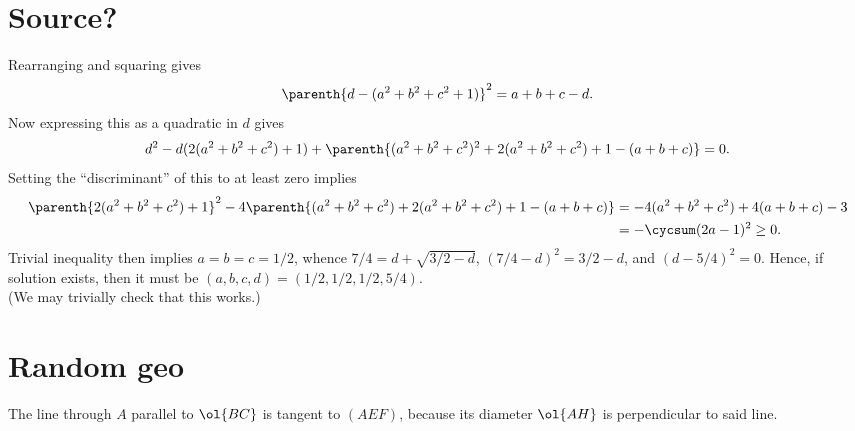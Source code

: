 \documentclass{seto}
\begin{document}
\section{Source?}
Rearranging and squaring gives 
\[\parenth{d-(a^2+b^2+c^2+1)}^2=a+b+c-d.\]
Now expressing this as a quadratic in $d$ gives
\[d^2-d(2(a^2+b^2+c^2)+1)+\parenth{(a^2+b^2+c^2)^2+2(a^2+b^2+c^2)+1-(a+b+c)}=0.\]
Setting the ``discriminant'' of this to at least zero implies
\begin{align*}
\parenth{2(a^2+b^2+c^2)+1}^2-4\parenth{(a^2+b^2+c^2)+2(a^2+b^2+c^2)+1-(a+b+c)}
&=-4(a^2+b^2+c^2)+4(a+b+c)-3\\
&=-\cycsum(2a-1)^2\geq0.
\end{align*}
Trivial inequality then implies $a=b=c=1/2$, whence $7/4=d+\sqrt{3/2-d}$, $(7/4-d)^2=3/2-d$, and $(d-5/4)^2=0$. Hence, if solution exists, then it must be $(a,b,c,d)=(1/2,1/2,1/2,\boxed{5/4})$.\\
(We may trivially check that this works.)
\newpage
\section*{Random geo}

The line through $A$ parallel to $\ol{BC}$ is tangent to $(AEF)$, because its diameter $\ol{AH}$ is perpendicular to said line.\\
\end{document}
